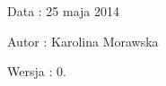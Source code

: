 \begin{DoxyDate}{Data}
\-: 25 maja 2014 
\end{DoxyDate}
\begin{DoxyAuthor}{Autor}
\-: Karolina Morawska 
\end{DoxyAuthor}
\begin{DoxyVersion}{Wersja}
\-: 0. 
\end{DoxyVersion}
